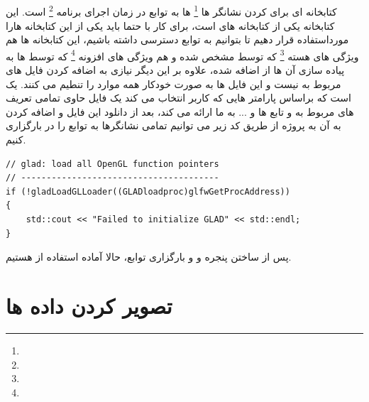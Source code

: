\documentclass[a4paper, 12pt]{report}
\newcommand{\lrit}[1]{\lr{\textit{#1}}}
\begin{document}
\newpage
\subsection{}
\noindent
\normalsize
    کتابخانه ای برای \lrit{load}  کردن نشانگر ها \footnote{} ها به توابع  در زمان اجرای برنامه \footnote{} است.
    این کتابخانه یکی از کتابخانه های است، برای کار با  حتما باید یکی از این کتابخانه هارا مورداستفاده قرار دهیم تا بتوانیم به توابع  دسترسی داشته باشیم، این کتابخانه ها هم ویژگی های هسته \footnote{} که توسط  مشخص شده و هم ویژگی های افزونه \footnote{} که توسط  ها به پیاده سازی آن ها از  اضافه شده، علاوه بر این دیگر نیازی به اضافه کردن فایل های مربوط به  نیست و این فایل ها به صورت خودکار همه موارد را تنطیم می کنند.
     یک  است که براساس پارامتر هایی که کاربر انتخاب می کند یک فایل حاوی تمامی تعریف های مربوط به  و تابع ها و ... به ما ارائه می کند، بعد از دانلود این فایل و اضافه کردن به آن به پروژه از طریق کد زیر می توانیم تمامی نشانگرها به توابع  را در  بارگزاری کنیم.

    \begin{LTR}
        \small
        \begin{lstlisting}[style=C++Style,caption=\lr{load opengl function pointer}]
// glad: load all OpenGL function pointers
// ---------------------------------------
if (!gladLoadGLLoader((GLADloadproc)glfwGetProcAddress))
{
    std::cout << "Failed to initialize GLAD" << std::endl;
}
        \end{lstlisting}
    \end{LTR}
    \normalsize
    \vspace*{0.3cm}
    پس از ساختن پنجره و  و بارگزاری توابع، حالا آماده استفاده از  هستیم.

\newpage




\section{\fontsize{15pt}{1.0cm}\zarbold\textbf{تصویر کردن داده ها}}
\vspace*{0.6cm}
\end{document}
